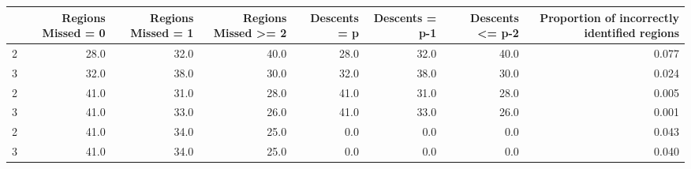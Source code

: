 \begin{tabular}{lrrrrrrr}
\toprule
{} &  Regions Missed = 0 &  Regions Missed = 1 &  Regions Missed >= 2 &  Descents = p &  Descents = p-1 &  Descents <= p-2 &  Proportion of incorrectly identified regions \\
\midrule
2 &                28.0 &                32.0 &                 40.0 &          28.0 &            32.0 &             40.0 &                                         0.077 \\
3 &                32.0 &                38.0 &                 30.0 &          32.0 &            38.0 &             30.0 &                                         0.024 \\
2 &                41.0 &                31.0 &                 28.0 &          41.0 &            31.0 &             28.0 &                                         0.005 \\
3 &                41.0 &                33.0 &                 26.0 &          41.0 &            33.0 &             26.0 &                                         0.001 \\
2 &                41.0 &                34.0 &                 25.0 &           0.0 &             0.0 &              0.0 &                                         0.043 \\
3 &                41.0 &                34.0 &                 25.0 &           0.0 &             0.0 &              0.0 &                                         0.040 \\
\bottomrule
\end{tabular}
